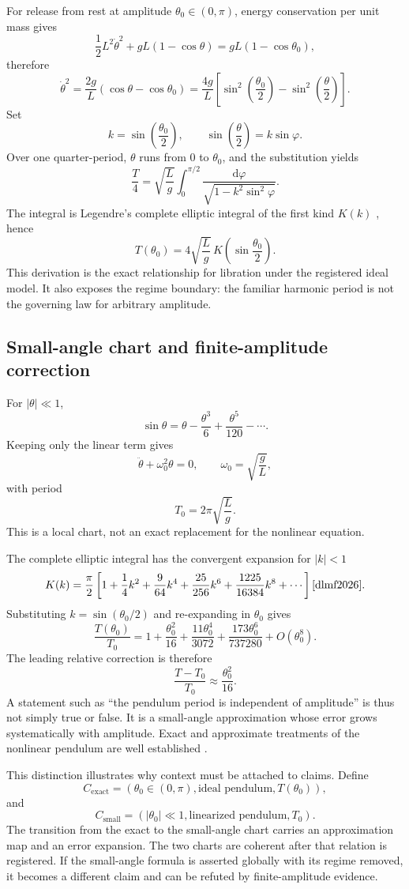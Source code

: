 \documentclass[11pt]{article}
\begin{document}
For release from rest at amplitude \(\theta_0\in(0,\pi)\), energy conservation per unit mass gives
\[
\frac12L^2\dot\theta^2+gL(1-\cos\theta)
=gL(1-\cos\theta_0),
\]
therefore
\[
\dot\theta^2
=\frac{2g}{L}(\cos\theta-\cos\theta_0)
=\frac{4g}{L}\left[\sin^2\!\left(\frac{\theta_0}{2}\right)
-\sin^2\!\left(\frac{\theta}{2}\right)\right].
\]
Set
\[
k=\sin\left(\frac{\theta_0}{2}\right),
\qquad
\sin\left(\frac\theta2\right)=k\sin\varphi.
\]
Over one quarter-period, \(\theta\) runs from \(0\) to \(\theta_0\), and the substitution yields
\[
\frac{T}{4}
=\sqrt{\frac{L}{g}}
\int_0^{\pi/2}
\frac{\mathrm d\varphi}{\sqrt{1-k^2\sin^2\varphi}}.
\]
The integral is Legendre's complete elliptic integral of the first kind \(K(k)\) \cite{dlmf2026}, hence
\[
\boxed{T(\theta_0)=4\sqrt{\frac{L}{g}}\,K\!\left(\sin\frac{\theta_0}{2}\right).}
\]
This derivation is the exact relationship for libration under the registered ideal model. It also exposes the regime boundary: the familiar harmonic period is not the governing law for arbitrary amplitude.

\subsection{Small-angle chart and finite-amplitude correction}

For \(|\theta|\ll1\),
\[
\sin\theta=\theta-\frac{\theta^3}{6}+\frac{\theta^5}{120}-\cdots.
\]
Keeping only the linear term gives
\[
\ddot\theta+\omega_0^2\theta=0,
\qquad \omega_0=\sqrt{\frac gL},
\]
with period
\[
T_0=2\pi\sqrt{\frac Lg}.
\]
This is a local chart, not an exact replacement for the nonlinear equation.

The complete elliptic integral has the convergent expansion for \(|k|<1\)
\[
K(k)=\frac\pi2
\left[
1+\frac14k^2+\frac{9}{64}k^4+\frac{25}{256}k^6
+\frac{1225}{16384}k^8+\cdots
\right] \cite{dlmf2026}.
\]
Substituting \(k=\sin(\theta_0/2)\) and re-expanding in \(\theta_0\) gives
\[
\frac{T(\theta_0)}{T_0}
=1+\frac{\theta_0^2}{16}
+\frac{11\theta_0^4}{3072}
+\frac{173\theta_0^6}{737280}
+O(\theta_0^8).
\]
The leading relative correction is therefore
\[
\frac{T-T_0}{T_0}\approx\frac{\theta_0^2}{16}.
\]
A statement such as ``the pendulum period is independent of amplitude'' is thus not simply true or false. It is a small-angle approximation whose error grows systematically with amplitude. Exact and approximate treatments of the nonlinear pendulum are well established \cite{reinberger2021,graber2018}.

This distinction illustrates why context must be attached to claims. Define
\[
C_{\mathrm{exact}}=(\theta_0\in(0,\pi),\text{ideal pendulum},T(\theta_0)),
\]
and
\[
C_{\mathrm{small}}=(|\theta_0|\ll1,\text{linearized pendulum},T_0).
\]
The transition from the exact to the small-angle chart carries an approximation map and an error expansion. The two charts are coherent after that relation is registered. If the small-angle formula is asserted globally with its regime removed, it becomes a different claim and can be refuted by finite-amplitude evidence.
\end{document}
